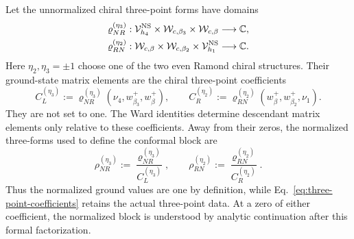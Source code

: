 \documentclass[11pt]{article}
\newcommand{\NS}{\mathrm{NS}}
\begin{document}
Let the unnormalized chiral three-point forms have domains
\begin{align}
 \varrho_{NR}^{(\eta_3)}&:
 \mathcal V_{h_4}^{\NS}\times
 \mathcal W_{c,\beta_3}\times
 \mathcal W_{c,\beta}\longrightarrow\mathbb C,
 \notag\\
 \varrho_{RN}^{(\eta_2)}&:
 \mathcal W_{c,\beta}\times
 \mathcal W_{c,\beta_2}\times
 \mathcal V_{h_1}^{\NS}\longrightarrow\mathbb C.
 \label{eq:three-form-domains}
\end{align}
Here \(\eta_2,\eta_3=\pm1\) choose one of the two even Ramond chiral
structures.  Their ground-state matrix elements are the chiral
three-point coefficients
\begin{equation}
 C_L^{(\eta_3)}
 :=\varrho_{NR}^{(\eta_3)}
   (\nu_4,w_{\beta_3}^+,w_\beta^+),
 \qquad
 C_R^{(\eta_2)}
 :=\varrho_{RN}^{(\eta_2)}
   (w_\beta^+,w_{\beta_2}^+,\nu_1).
 \label{eq:three-point-coefficients}
\end{equation}
They are not set to one.  The Ward identities determine descendant
matrix elements only relative to these coefficients.  Away from their
zeros, the normalized three-forms used to define the conformal
block are
\[
 \rho_{NR}^{(\eta_3)}:=
 \frac{\varrho_{NR}^{(\eta_3)}}{C_L^{(\eta_3)}},
 \qquad
 \rho_{RN}^{(\eta_2)}:=
 \frac{\varrho_{RN}^{(\eta_2)}}{C_R^{(\eta_2)}}.
\]
Thus the normalized ground values are one by definition, while
Eq.~\eqref{eq:three-point-coefficients} retains the actual three-point
data.  At a zero of either coefficient, the normalized block is
understood by analytic continuation after this formal factorization.
\end{document}
